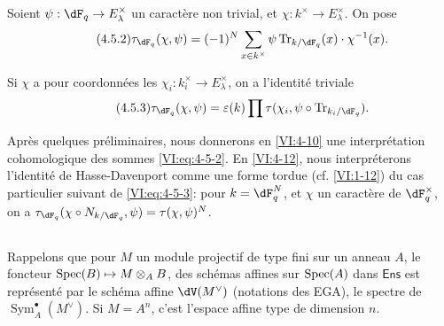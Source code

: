 Soient $\psi:\dF_q\to E_\lambda^\times$ un caractère non trivial, et 
$\chi:k^\times \to E_\lambda^\times$. On pose 
\begin{equation*}\tag{4.5.2}\label{VI:eq:4-5-2}
  \tau_{\dF_q}(\chi,\psi) = (-1)^N \sum_{x\in k^\times} \psi \tr_{k/\dF_q}(x) \cdot \chi^{-1}(x) \text{.} 
\end{equation*}

Si $\chi$ a pour coordonnées les $\chi_i:k_i^\times \to E_\lambda^\times$, on 
a l'identité triviale 
\begin{equation*}\tag{4.5.3}\label{VI:eq:4-5-3}
  \tau_{\dF_q}(\chi,\psi) = \varepsilon(k) \prod \tau(\chi_i,\psi\circ \tr_{k_i/\dF_q}) \text{.}
\end{equation*}

Après quelques préliminaires, nous donnerons en \ref{VI:4-10} une 
interprétation cohomologique des sommes \eqref{VI:eq:4-5-2}. En 
\ref{VI:4-12}, nous interpréterons l'identité de Hasse-Davenport comme une 
forme tordue (cf. \ref{VI:1-12}) du cas particulier suivant de 
\eqref{VI:eq:4-5-3}: pour $k=\dF_q^N$, et $\chi$ un caractère de 
$\dF_q^\times$, on a 
$\tau_{\dF_q}(\chi\circ N_{k/\dF_q},\psi)=\tau(\chi,\psi)^N$. 





\subsection{}\label{VI:4-6}

Rappelons que pour $M$ un module projectif de type fini sur un anneau $A$, le 
foncteur $\operatorname{Spec}(B)\mapsto M\otimes_A B$, des schémas affines sur $\operatorname{Spec}(A)$ 
dans $\mathsf{Ens}$ est représenté par le schéma affine $\dV(M^\vee)$ 
(notations des EGA), le spectre de $\operatorname{Sym}_A^\bullet(M^\vee)$. Si 
$M=A^n$, c'est l'espace affine type de dimension $n$. 

